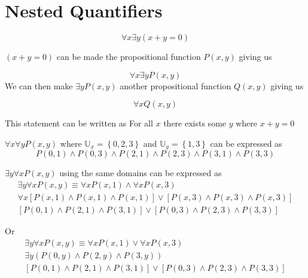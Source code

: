 \documentclass[12pt letter]{report}
\begin{document}
\pagebreak
\section{Nested Quantifiers}


\[
	\forall x \exists y \left( x + y = 0 \right)
\]

$ \left( x + y = 0 \right)  $ can be made the propositional function $P \left( x, y \right) $ giving us

\[
	\forall x \exists y P \left( x, y \right)
\]
We can then make $\exists y P \left( x, y \right) $ another propositional function $Q \left( x, y \right) $ giving us

\[
	\forall x Q \left( x, y \right)
\]

This statement can be written as For all $x$ there exists some $y$ where $x + y = 0$

\noindent $\forall x \forall y P \left( x, y \right) $ where $\mathbb{U}_{x} = \left\{ 0, 2, 3 \right\} $ and $\mathbb{U}_{y} =
	\left\{ 1,3 \right\} $ can be expressed as
\[
	P \left( 0,1 \right)  \wedge P \left( 0,3 \right) \wedge P \left( 2,1 \right)  \wedge P \left( 2,3 \right)  \wedge P
	\left( 3,1 \right)  \wedge P \left( 3,3 \right)
\]

\noindent $\exists y \forall x P \left( x,y \right) $ using the same domains can be expressed as
\begin{align*}
	\exists y \forall x P \left( x,y \right) \equiv \forall x P \left( x,1 \right)  \wedge \forall x P \left( x,3
	\right)                                                                                         \\
	\forall x \left[ P \left( x, 1 \right) \wedge  P \left( x, 1 \right) \wedge  P \left( x,1 \right)    \right]  \vee
	\left[ P \left( x,3 \right) \wedge  P \left( x,3 \right) \wedge P \left( x,3 \right)    \right] \\
	\left[ P \left( 0,1 \right) \wedge  P \left( 2,1 \right) \wedge P \left( 3,1 \right)    \right]  \vee
	\left[ P \left( 0,3 \right) \wedge  P \left( 2,3 \right) \wedge  P \left( 3,3 \right)    \right]
\end{align*}


Or
\begin{align*}
	\exists y \forall x P \left( x,y \right) \equiv \forall x P \left( x,1 \right)  \vee \forall x P \left( x,3 \right)
	\\
	\exists y \left( P \left( 0, y \right) \wedge P \left( 2, y \right) \wedge P \left( 3, y \right)    \right) \\
	\left[ P \left( 0,1 \right) \wedge P \left( 2, 1 \right) \wedge P \left( 3, 1 \right)  \right] \vee \left[ P \left(
		0,3\right) \wedge P \left( 2,3 \right) \wedge P \left( 3,3 \right)     \right]
\end{align*}
\end{document}
